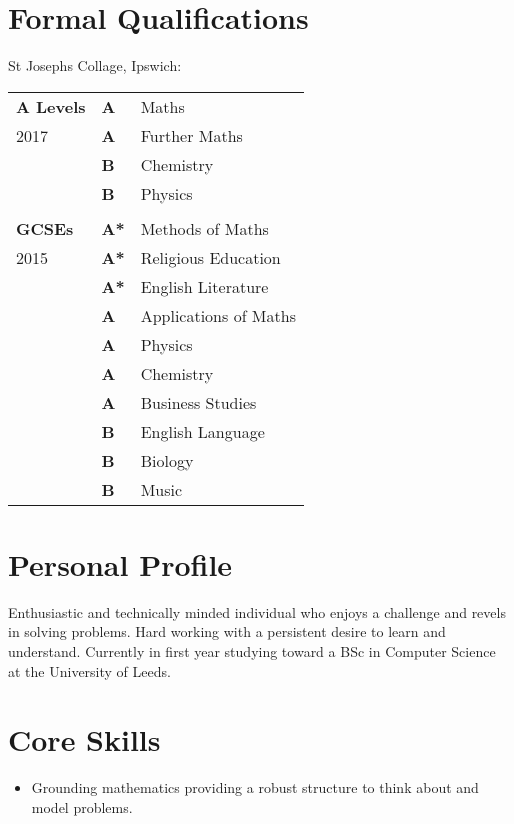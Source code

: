 \documentclass[9pt,a4paper]{article}
\begin{document}
\begin{multicols*}{2}
  \section*{Formal Qualifications}
  \vspace*{-.3cm}
  St Josephs Collage, Ipswich:
  \vspace*{-.6cm}
\begin{center}
  \begin{tabular}{p{2cm} p{0.6cm} p{5.4cm}}
    \textbf{A Levels}&\textbf{A}&Maths\\
	2017&\textbf{A}&Further Maths\\
	    &\textbf{B}&Chemistry\\
	    &\textbf{B}&Physics\\
\\
    \textbf{GCSEs}&\textbf{A*}&Methods of Maths\\
	2015&\textbf{A*}&Religious Education\\
	    &\textbf{A*}&English Literature\\
 	    &\textbf{A}&Applications of Maths\\
	    &\textbf{A}&Physics\\
	    &\textbf{A}&Chemistry\\
	    &\textbf{A}&Business Studies\\
	    &\textbf{B}&English Language\\
	    &\textbf{B}&Biology\\
	    &\textbf{B}&Music\\
  \end{tabular}
\end{center}


\section*{Personal Profile}
Enthusiastic and technically minded individual who enjoys a challenge and revels in solving problems.
Hard working with a persistent desire to learn and understand.
Currently in first year studying toward a BSc in Computer Science at the University of Leeds.

\section*{Core Skills}
\begin{itemize}
\item Grounding mathematics providing a robust structure to think about and model problems.


\end{itemize}
\end{multicols*}
\end{document}
